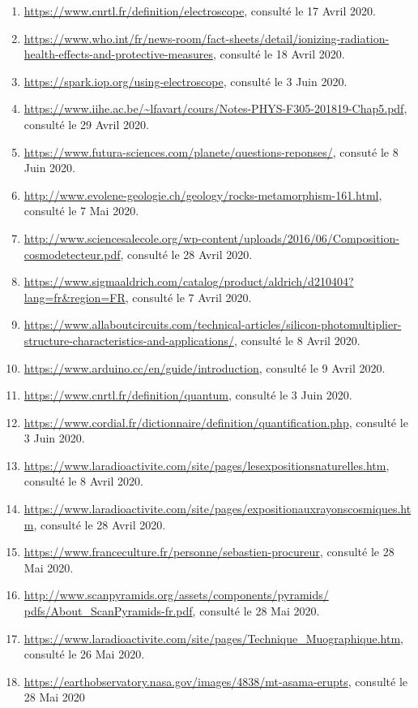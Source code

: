 \documentclass[a4paper, 12pt]{article}
\begin{document}
\begin{spacing}{1.5}
\begin{enumerate}
  \item \url{https://www.cnrtl.fr/definition/electroscope}, consulté le 17 Avril 2020.
  \item \url{https://www.who.int/fr/news-room/fact-sheets/detail/ionizing-radiation-health-effects-and-protective-measures}, consulté le 18 Avril 2020.
  \item \url{https://spark.iop.org/using-electroscope}, consulté le 3 Juin 2020.
  \item \url{https://www.iihe.ac.be/~lfavart/cours/Notes-PHYS-F305-201819-Chap5.pdf}, consulté le 29 Avril 2020.
  \item \url{https://www.futura-sciences.com/planete/questions-reponses/}, consuté le 8 Juin 2020.
  \item \url{http://www.evolene-geologie.ch/geology/rocks-metamorphism-161.html}, consulté le 7 Mai 2020.
  \item \url{http://www.sciencesalecole.org/wp-content/uploads/2016/06/Composition- cosmodetecteur.pdf}, consulté le 28 Avril 2020.
  \item \url{https://www.sigmaaldrich.com/catalog/product/aldrich/d210404?lang=fr&region=FR}, consulté le 7 Avril 2020.
  \item \url{https://www.allaboutcircuits.com/technical-articles/silicon-photomultiplier- structure-characteristics-and-applications/}, consulté le 8 Avril 2020.
  \item \url{https://www.arduino.cc/en/guide/introduction}, consulté le 9 Avril 2020.
  \item \url{https://www.cnrtl.fr/definition/quantum}, consulté le 3 Juin 2020.
  \item \url{https://www.cordial.fr/dictionnaire/definition/quantification.php}, consulté le 3 Juin 2020.
  \item \url{https://www.laradioactivite.com/site/pages/lesexpositionsnaturelles.htm}, consulté le 8 Avril 2020.
  \item \url{https://www.laradioactivite.com/site/pages/expositionauxrayonscosmiques.htm}, consulté le 28 Avril 2020.
  \item \url{https://www.franceculture.fr/personne/sebastien-procureur}, consulté le 28 Mai 2020.
  \item \url{http://www.scanpyramids.org/assets/components/pyramids/ pdfs/About_ScanPyramids-fr.pdf}, consulté le 28 Mai 2020.
  \item \url{https://www.laradioactivite.com/site/pages/Technique_Muographique.htm}, consulté le 26 Mai 2020.
  \item \url{https://earthobservatory.nasa.gov/images/4838/mt-asama-erupts}, consulté le 28 Mai 2020

\end{enumerate}
\end{spacing}
\end{document}
